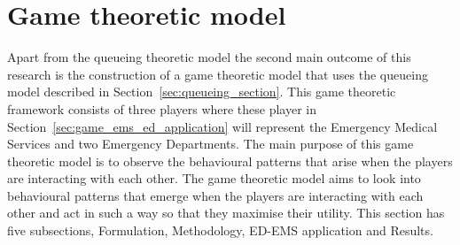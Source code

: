 \chapter{Game theoretic model}\label{sec:game_theoretic_model}

Apart from the queueing theoretic model the second main outcome of this research
is the construction of a game theoretic model that uses the queueing model
described in Section~\ref{sec:queueing_section}.
This game theoretic framework consists of three players where these player in
Section~\ref{sec:game_ems_ed_application} will represent the Emergency Medical
Services and two Emergency Departments.
The main purpose of this game theoretic model is to observe the behavioural
patterns that arise when the players are interacting with each other.
The game theoretic model aims to look into behavioural patterns that emerge
when the players are interacting with each other and act in such a way so that
they maximise their utility. 
This section has five subsections, Formulation, Methodology, ED-EMS application
and Results.








